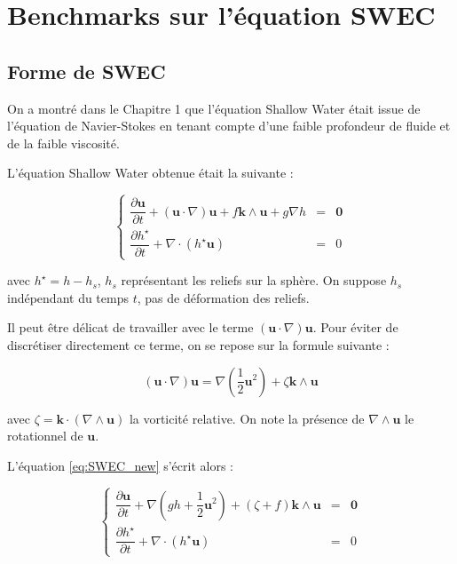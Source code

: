 \chapter{Benchmarks sur l'équation SWEC}

\section{Forme de SWEC}

On a montré dans le Chapitre 1 que l'équation Shallow Water était issue de l'équation de Navier-Stokes en tenant compte d'une faible profondeur de fluide et de la faible viscosité.

L'équation Shallow Water obtenue était la suivante :

\begin{equation}
\label{eq:SWEC_new}
\left\lbrace
\begin{array}{rcl}
\dfrac{\partial \mathbf{u}}{\partial t} + \left( \mathbf{u} \cdot \nabla \right) \mathbf{u} + f \mathbf{k} \wedge \mathbf{u} + g \nabla h & = & \mathbf{0} \\
\dfrac{\partial h^{\star}}{\partial t} + \nabla \cdot \left( h^{\star} \mathbf{u} \right) & = & 0
\end{array}
\right.
\end{equation}

avec $h^{\star} = h - h_s$, $h_s$ représentant les reliefs sur la sphère. On suppose $h_s$ indépendant du temps $t$, pas de déformation des reliefs.

Il peut être délicat de travailler avec le terme $\left( \mathbf{u} \cdot \nabla \right) \mathbf{u}$. Pour éviter de discrétiser directement ce terme, on se repose sur la formule suivante :

\begin{equation}
\left( \mathbf{u} \cdot \nabla \right) \mathbf{u} = \nabla \left( \dfrac{1}{2} \mathbf{u}^2 \right) + \zeta \mathbf{k} \wedge \mathbf{u}
\end{equation}

avec $\zeta = \mathbf{k} \cdot \left( \nabla \wedge \mathbf{u} \right)$ la vorticité relative. On note la présence de $\nabla \wedge \mathbf{u}$ le rotationnel de $\mathbf{u}$.

L'équation \eqref{eq:SWEC_new} s'écrit alors :

\begin{equation}
\label{eq:SWEC_vectform}
\left\lbrace
\begin{array}{rcl}
\dfrac{\partial \mathbf{u}}{\partial t} + \nabla \left( g h + \dfrac{1}{2} \mathbf{u}^2  \right) + \left( \zeta + f \right) \mathbf{k} \wedge \mathbf{u} & = & \mathbf{0} \\
\dfrac{\partial h^{\star}}{\partial t} + \nabla \cdot \left( h^{\star} \mathbf{u} \right) & = & 0
\end{array}
\right.
\end{equation}

